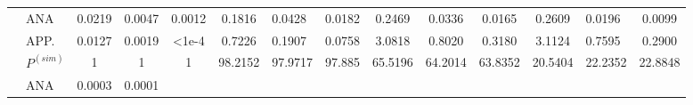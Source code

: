 \documentclass[a4paper]{IEEEtran}
\begin{document}
\begin{table}[ht!]
\begin{tabular}{|ll|ccc|ccc|ccc|ccc|}
\multicolumn{1}{|l|}{\cellcolor[HTML]{C0C0C0}}                        
& \cellcolor[HTML]{C0C0C0}ANA                          
& \multicolumn{1}{c|}{\cellcolor[HTML]{FFFFFF}0.0219}          
& \multicolumn{1}{l|}{\cellcolor[HTML]{FFFFFF}0.0047}          
& 0.0012                                  
& \multicolumn{1}{c|}{\cellcolor[HTML]{FFFFFF}0.1816} 
& \multicolumn{1}{l|}{\cellcolor[HTML]{FFFFFF}0.0428} 
& 0.0182                         
& \multicolumn{1}{c|}{\cellcolor[HTML]{FFFFFF}0.2469} 
& \multicolumn{1}{c|}{\cellcolor[HTML]{FFFFFF}0.0336} 
& 0.0165                         
& \multicolumn{1}{c|}{\cellcolor[HTML]{FFFFFF}0.2609} 
& \multicolumn{1}{l|}{\cellcolor[HTML]{FFFFFF}0.0196} 
& 0.0099                         
\\ \cline{2-14} 
\rowcolor[HTML]{FFFFFF} 
\multicolumn{1}{|l|}{\multirow{-3}{*}{\cellcolor[HTML]{C0C0C0}(2,2)}} 
& \cellcolor[HTML]{C0C0C0}APP.                         
& \multicolumn{1}{c|}{\cellcolor[HTML]{FFFFFF}0.0127}          
& \multicolumn{1}{l|}{\cellcolor[HTML]{FFFFFF}0.0019}          
& \cellcolor[HTML]{FFFFFF}\textless{}1e-4 
& \multicolumn{1}{c|}{\cellcolor[HTML]{FFFFFF}0.7226} 
& \multicolumn{1}{l|}{\cellcolor[HTML]{FFFFFF}0.1907}  
& \cellcolor[HTML]{FFFFFF}0.0758 
& \multicolumn{1}{c|}{\cellcolor[HTML]{FFFFFF}3.0818} 
& \multicolumn{1}{c|}{\cellcolor[HTML]{FFFFFF}0.8020} 
& \cellcolor[HTML]{FFFFFF}0.3180 
& \multicolumn{1}{c|}{\cellcolor[HTML]{FFFFFF}3.1124} 
& \multicolumn{1}{l|}{\cellcolor[HTML]{FFFFFF}0.7595} 
& \cellcolor[HTML]{FFFFFF}0.2900 
\\ \hline
\multicolumn{1}{|l|}{\cellcolor[HTML]{C0C0C0}}                        
& \cellcolor[HTML]{C0C0C0}$P^{(sim)}$
& \multicolumn{1}{c|}{1}                                       
& \multicolumn{1}{c|}{1}                                       
& 1                                       
& \multicolumn{1}{l|}{98.2152}                       
& \multicolumn{1}{l|}{97.9717}                         
& 97.885                         
& \multicolumn{1}{l|}{65.5196}                        
& \multicolumn{1}{l|}{64.2014}                        
& \multicolumn{1}{l|}{63.8352}   
& \multicolumn{1}{l|}{20.5404}                        
& \multicolumn{1}{l|}{22.2352}                        
& 22.8848                        
\\ \cline{2-14} 
\rowcolor[HTML]{FFFFFF} 
\multicolumn{1}{|l|}{\cellcolor[HTML]{C0C0C0}}                        
& \cellcolor[HTML]{C0C0C0}ANA                          
& \multicolumn{1}{c|}{\cellcolor[HTML]{FFFFFF}0.0003}          
& \multicolumn{1}{l|}{\cellcolor[HTML]{FFFFFF}0.0001}          

\end{tabular}
\end{table}
\end{document}
